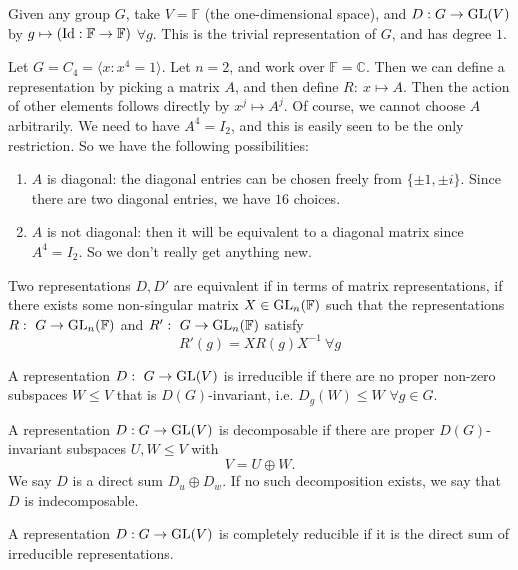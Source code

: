 \documentclass[a4paper]{article}
\begin{document}
\begin{eg}
  Given any group $G$, take $V = \mathbb{F}$ (the one-dimensional space), and $D: G \rightarrow \operatorname{GL}(V)$ by $g \mapsto (\operatorname{Id}: \mathbb{F} \to \mathbb{F})$ $\forall g$. This is the trivial representation of $G$, and has degree $1$.
\end{eg}
\begin{eg}
  Let $G = C_4 = \langle x: x^4 = 1\rangle$. Let $n = 2$, and work over $\mathbb{F} = \mathbb{C}$. Then we can define a representation by picking a matrix $A$, and then define $R:~x \mapsto A$. Then the action of other elements follows directly by $x^j \mapsto A^j$. Of course, we cannot choose $A$ arbitrarily. We need to have $A^4 = I_2$, and this is easily seen to be the only restriction. So we have the following possibilities:
  \begin{enumerate}
    \item $A$ is diagonal: the diagonal entries can be chosen freely from $\{\pm 1, \pm i\}$. Since there are two diagonal entries, we have $16$ choices.
    \item $A$ is not diagonal: then it will be equivalent to a diagonal matrix since $A^4 = I_2$. So we don't really get anything new.
  \end{enumerate}
\end{eg}
\begin{defi}
  Two representations $D, D'$ are equivalent if in terms of matrix representations, if there exists some non-singular matrix $X \in \operatorname{GL}_n(\mathbb{F})$ such that the representations $R:~G \rightarrow \operatorname{GL}_n(\mathbb{F})$ and $R':~G \rightarrow \operatorname{GL}_n(\mathbb{F})$ satisfy
$$R'(g) = X R(g) X^{-1}~\forall g$$
\end{defi}
\begin{defi}
  A representation $D:~G\rightarrow\operatorname{GL}(V)$ is irreducible if there are no proper non-zero subspaces $W\leq V$ that is $D(G)$-invariant, i.e. $D_g(W)\leq W$ $\forall g\in G$.
\end{defi}
\begin{defi}
  A representation $D: G \rightarrow \operatorname{GL}(V)$ is decomposable if there are proper $D(G)$-invariant subspaces $U, W \leq V$ with
  $$V = U \oplus W.$$
  We say $D$ is a direct sum $D_u \oplus D_w$.   If no such decomposition exists, we say that $D$ is indecomposable.
\end{defi}
\begin{defi}
  A representation $D: G \rightarrow \operatorname{GL}(V)$ is completely reducible if it is the direct sum of irreducible representations.
\end{defi}
\end{document}
